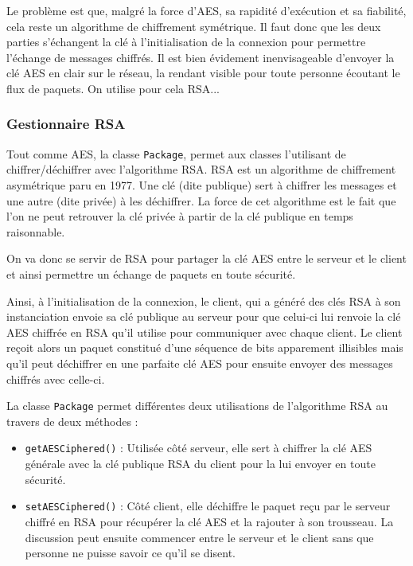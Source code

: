 \documentclass{article}
\begin{document}
Le problème est que, malgré la force d'AES, sa rapidité d'exécution et sa fiabilité, cela reste un algorithme de chiffrement symétrique. 
Il faut donc que les deux parties s'échangent la clé à l'initialisation de la connexion pour permettre l'échange de messages chiffrés. 
Il est bien évidement inenvisageable d'envoyer la clé AES en clair sur le réseau, la rendant visible pour toute personne écoutant le flux de paquets. 
On utilise pour cela RSA...

\subsubsection{Gestionnaire RSA}

Tout comme AES, la classe \texttt{Package}, permet aux classes l'utilisant de chiffrer/déchiffrer avec l'algorithme RSA. 
RSA est un algorithme de chiffrement asymétrique paru en 1977. Une clé (dite publique) sert à chiffrer les messages et une autre (dite privée) à les déchiffrer. 
La force de cet algorithme est le fait que l'on ne peut retrouver la clé privée à partir de la clé publique en temps raisonnable. 

On va donc se servir de RSA pour partager la clé AES entre le serveur et le client et ainsi permettre un échange de paquets en toute sécurité. 

Ainsi, à l'initialisation de la connexion, le client, qui a généré des clés RSA à son instanciation envoie sa clé publique 
au serveur pour que celui-ci lui renvoie la clé AES chiffrée en RSA qu'il utilise pour communiquer avec chaque client. 
Le client reçoit alors un paquet constitué d'une séquence de bits apparement illisibles mais qu'il peut déchiffrer en une parfaite 
clé AES pour ensuite envoyer des messages chiffrés avec celle-ci. 

La classe \texttt{Package} permet différentes deux utilisations de l'algorithme RSA au travers de deux méthodes :
\begin{itemize}
    \item \texttt{getAESCiphered()} : Utilisée côté serveur, elle sert à chiffrer la clé AES générale avec la clé publique RSA 
    du client pour la lui envoyer en toute sécurité. 
    \item \texttt{setAESCiphered()} : Côté client, elle déchiffre le paquet reçu par le serveur chiffré en RSA pour récupérer la clé AES 
    et la rajouter à son trousseau. La discussion peut ensuite commencer entre le serveur et le client sans que personne ne puisse savoir ce qu'il se disent.
\end{itemize}
\end{document}
